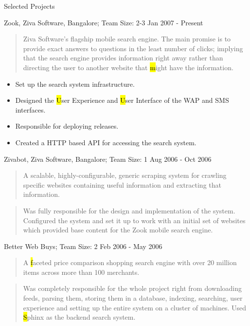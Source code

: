 \documentclass{resume}
\newcommand{\teamsize}{\sc\footnotesize Team Size: }
\begin{document}
\begin{category}{Selected Projects}{}
    \item {\topic Zook,} Ziva Software, Bangalore;
        {\teamsize 2-3}
        {\period Jan 2007 - Present}
        \begin{quote}
            Ziva Software's flagship mobile search engine.  The main promise is to
            provide exact answers to questions in the least number of clicks;
            implying that the search engine provides information right away rather
            than directing the user to another website that {\hl might} have the
            information.
        \end{quote}

            \begin{itemize}
                \item Set up the search system infrastructure.
                \item Designed the {\hl User Experience} and {\hl User Interface}
                    of the WAP and SMS interfaces.
                \item Responsible for deploying releases.
                \item Created a HTTP based API for accessing the search system.
            \end{itemize}

    \pagebreak

    \item {\topic Zivabot,} Ziva Software, Bangalore;
        {\teamsize 1}
        {\period Aug 2006 - Oct 2006}
        \begin{quote}
            A scalable, highly-configurable, generic scraping system for crawling
            specific websites containing useful information and extracting that
            information.
        \end{quote}
        \begin{quote}
            Was fully responsible for the design and implementation of the system.
            Configured the system and set it up to work with an initial set of
            websites which provided base content for the Zook mobile search engine.
        \end{quote}

    \item {\topic Better Web Buys;}
        {\teamsize 2}
        {\period Feb 2006 - May 2006}
        \begin{quote}
            A {\hl faceted price comparison shopping search engine} with over 20
            million items across more than 100 merchants.
        \end{quote}
        \begin{quote}
            Was completely responsible for the whole project right from downloading
            feeds, parsing them, storing them in a database, indexing, searching,
            user experience and setting up the entire system on a cluster of
            machines. Used {\hl Sphinx} as the backend search system.
        \end{quote}


\end{category}
\end{document}

